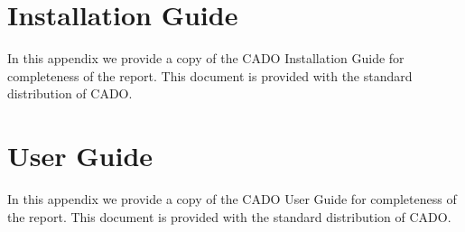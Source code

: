 \documentclass[11pt,a4paper, bibtotoc,idxtotoc,headsepline,footsepline,footexclude,DIV13,oneside]{scrbook}
\begin{document}
	\frontmatter
	
	
	
	
	
	
	
	
	
	\listoftodos
	\tableofcontents
   	

	\mainmatter
	
				
		
		
		
		
		
		
 
		
		
		
		\appendix 
		
		\chapter{Installation Guide}
		\label{app:installationGuide}
	        In this appendix we provide a copy of the CADO Installation Guide for completeness of the report. This document is provided with the standard distribution of CADO.
		
		\chapter{User Guide}
		\label{app:userGuide}
		In this appendix we provide a copy of the CADO User Guide for completeness of the report. This document is provided with the standard distribution of CADO.
		
		
\end{document}
